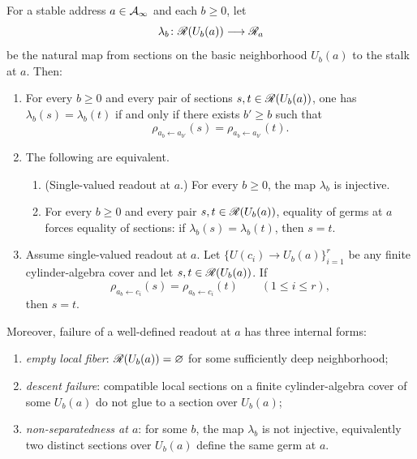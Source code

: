 \begin{theorem}
\label{thm:recursive-addressing-readout-separatedness-null}
For a stable address $a\in\mathcal{A}_{\infty}$ and each $b\ge 0$, let
\[
\lambda_b\colon \mathscr{R}(U_b(a))\longrightarrow \mathscr{R}_a
\]
be the natural map from sections on the basic neighborhood $U_b(a)$ to the
stalk at $a$.  Then:
\begin{enumerate}[label=\textup{(\arabic*)}]
\item For every $b\ge 0$ and every pair of sections
$s,t\in \mathscr{R}(U_b(a))$, one has $\lambda_b(s)=\lambda_b(t)$ if and only if
there exists $b'\ge b$ such that
\[
\rho_{a_b\leftarrow a_{b'}}(s)=\rho_{a_b\leftarrow a_{b'}}(t).
\]
\item The following are equivalent.
\begin{enumerate}[label=\textup{(\alph*)}]
\item \textup{(Single-valued readout at $a$.)} For every $b\ge 0$, the map
$\lambda_b$ is injective.
\item For every $b\ge 0$ and every pair $s,t\in\mathscr{R}(U_b(a))$, equality of
germs at $a$ forces equality of sections: if $\lambda_b(s)=\lambda_b(t)$, then
$s=t$.
\end{enumerate}
\item Assume single-valued readout at $a$.  Let
$\{U(c_i)\to U_b(a)\}_{i=1}^r$ be any finite cylinder-algebra cover and let
$s,t\in \mathscr{R}(U_b(a))$.  If
\[
\rho_{a_b\leftarrow c_i}(s)=\rho_{a_b\leftarrow c_i}(t)
\qquad
(1\le i\le r),
\]
then $s=t$.
\end{enumerate}

Moreover, failure of a well-defined readout at $a$ has three internal forms:
\begin{enumerate}[label=\textup{(\roman*)}]
\item \emph{empty local fiber}: $\mathscr{R}(U_b(a))=\varnothing$ for some
sufficiently deep neighborhood;
\item \emph{descent failure}: compatible local sections on a finite
cylinder-algebra cover of some $U_b(a)$ do not glue to a section over $U_b(a)$;
\item \emph{non-separatedness at $a$}: for some $b$, the map
$\lambda_b$ is not injective, equivalently two distinct sections over
$U_b(a)$ define the same germ at $a$.
\end{enumerate}
\end{theorem}

